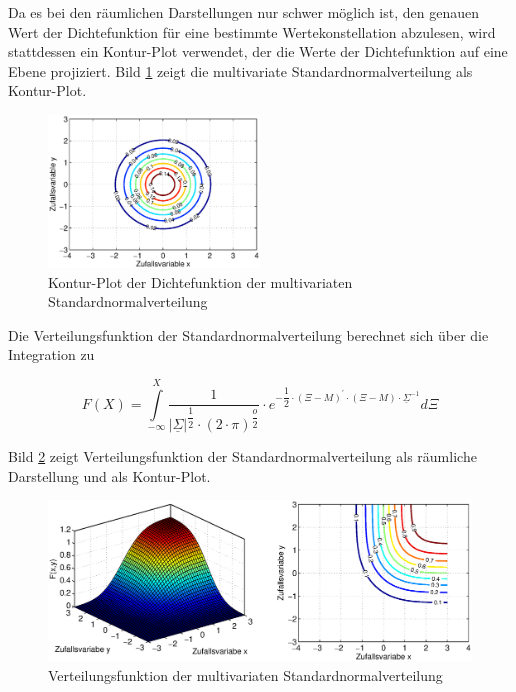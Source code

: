 \noindent Da es bei den r\"{a}umlichen Darstellungen nur schwer m\"{o}glich ist, den genauen Wert der Dichtefunktion f\"{u}r eine bestimmte Wertekonstellation abzulesen, wird stattdessen ein Kontur-Plot verwendet, der die Werte der Dichtefunktion auf eine Ebene projiziert. Bild \ref{fig:MultivarianteVerteilungen2} zeigt die multivariate Standardnormalverteilung als Kontur-Plot.

\noindent 
\begin{figure}[H]
  \centerline{\includegraphics[width=0.5\textwidth]{Kapitel8/Bilder/image11}}
  \caption{Kontur-Plot der Dichtefunktion der multivariaten Standardnormalverteilung}
  \label{fig:MultivarianteVerteilungen2}
\end{figure}

\noindent Die Verteilungsfunktion der Standardnormalverteilung berechnet sich \"{u}ber die Integration zu

\begin{equation}\label{eq:eighteightytwo}
F(X)=\int\limits _{-\infty}^{X}\dfrac{1}{\left|\underline{\Sigma }\right|^{\dfrac{1}{2}} \cdot (2\cdot \pi)^{\dfrac{o}{2}}} \cdot e^{-\dfrac{1}{2} \cdot (\Xi - M)^{'} \cdot (\Xi-M)\cdot \underline{\Sigma}^{-1}} d\Xi
\end{equation}

\noindent Bild \ref{fig:MultivarianteVerteilungen3} zeigt Verteilungsfunktion der Standardnormalverteilung als r\"{a}umliche Darstellung und als Kontur-Plot.

\clearpage

\noindent 
\begin{figure}[H]
  \centerline{\includegraphics[width=1\textwidth]{Kapitel8/Bilder/image12}}
  \caption{Verteilungsfunktion der multivariaten Standardnormalverteilung}
  \label{fig:MultivarianteVerteilungen3}
\end{figure}

